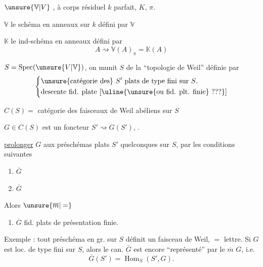 
$\unsure{\mathbb V|V}$ , à corps résiduel $k$ parfait,  $K$,  $\pi$.

$\mathbb V$ le schéma en anneaux sur $k$ défini par $\mathbb V$

$\mathbb K$ le ind-schéma en anneaux défini par
\[
A\rightsquigarrow\mathbb V(A)_\pi=\mathbb K(A)
\]

$S=\operatorname{Spec}(\unsure{V|\mathbb V})$, on munit $S$ de la ``topologie de Weil'' définie par
\[
\left\{\begin{aligned}
&\text{\unsure{catégorie des} $S'$ plats de type fini sur $S$.}\\
&\text{descente fid. plate [\uline{\unsure{ou fid. plt. finie} ???}]}
\end{aligned}\right.
\]

$C(S)=$ catégorie des faisceaux de Weil abéliens sur $S$

 $G\in C(S)$ est un foncteur $S'\rightsquigarrow G(S')$, .

 \uline{prolonger} $G$  aux préschémas plats $S'$ quelconques sur $S$, par les conditions suivantes

\begin{enumerate}[label=(\roman*)]
\item $\overline G$ 
\item $\overline G$ 
\end{enumerate}

Alors  $\unsure{\overline m|=}$

\begin{enumerate}[label=(\roman*),start=3]
\item $\overline G$  fid. plats de présentation finie.
\end{enumerate}

Exemple : tout préschéma en gr.  sur $S$ définit un faisceau de Weil,  $=$ lettre. Si $G$ est loc. de type fini sur $S$, alors le  can. $\overline G$ est encore ``représenté'' par le $\overline m$ $G$, i.e.
\[
\overline G(S')=\operatorname{Hom}_S(S',G).
\]
